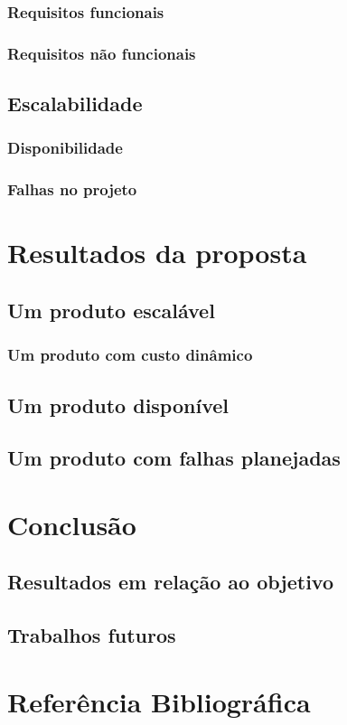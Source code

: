 \documentclass[]{../class/politex}
\begin{document}
      \subsection{Requisitos funcionais}

      \subsection{Requisitos não funcionais}

    \section{Escalabilidade}

      \subsection{Disponibilidade}

      \subsection{Falhas no projeto}

  

  \chapter{Resultados da proposta}

    \section{Um produto escalável}

      \subsection{Um produto com custo dinâmico}

    \section{Um produto disponível}

    \section{Um produto com falhas planejadas}

  \chapter{Conclusão}

    \section{Resultados em relação ao objetivo}

    \section{Trabalhos futuros}

  \chapter{Referência Bibliográfica}
\end{document}
